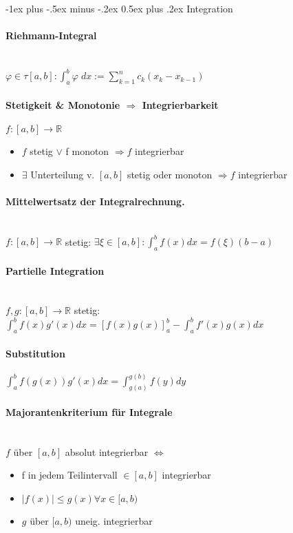 \documentclass[paper=a3,paper=landscape, fontsize=9pt, DIV=30]{scrartcl}
\makeatletter
\newcommand{\real}{{\mathbb{R}}}
\renewcommand{\section}{\@startsection{section}{1}{0mm}%
  {-1ex plus -.5ex minus -.2ex}%
  {0.5ex plus .2ex}%
  {\color{blue}\normalfont\large\bfseries}}
\makeatother
\begin{document}
\begin{multicols*}{4}
  
  \section{Integration}


  \paragraph{Riehmann-Integral}\hspace{0pt}\\
  $\varphi \in \tau [a,b]: \int_{a}^{b}\varphi \; dx := \sum_{k=1}^{n}c_k(x_k-x_{k-1})$


  \paragraph{Stetigkeit \& Monotonie $\Rightarrow$ Integrierbarkeit} $f: [a,b] \rightarrow \real$
  \begin{itemize}
  \item $f$ stetig $\vee$ f monoton $\Rightarrow f$ integrierbar
  \item $\exists$ Unterteilung v. $[a,b]$ stetig oder monoton $\Rightarrow f$ integrierbar
  \end{itemize}


  \paragraph{Mittelwertsatz der Integralrechnung.}\hspace{0pt}\\
  $f:[a,b] \rightarrow \real$ stetig: $\exists \xi \in [a,b]: \int_{a}^{b}f(x)dx=f(\xi)(b-a)$


  \paragraph{Partielle Integration}\hspace{0pt}\\
  $f,g: [a,b] \rightarrow \real$ stetig: $\int_{a}^{b}f(x)g'(x)dx=[f(x)g(x)]_a^b-\int_{a}^{b}f'(x)g(x) dx$


  \paragraph{Substitution}
  $\int_{a}^{b}f(g(x))g'(x)dx=\int_{g(a)}^{g(b)}f(y)dy$


  \paragraph{Majorantenkriterium für Integrale}\hspace{0pt} \\
  $f$ über $[a,b]$ absolut integrierbar $\Leftrightarrow$
  \begin{itemize}
  \item f in jedem Teilintervall $\in [a,b]$ integrierbar
  \item $\lvert f(x) \rvert \leq g(x) \forall x \in [a,b)$
  \item $g$ über $[a,b)$ uneig. integrierbar
  \end{itemize}


\end{multicols*}
\end{document}
